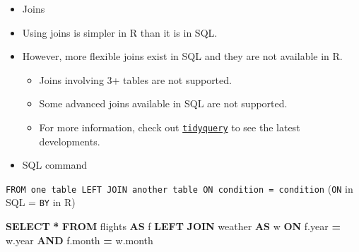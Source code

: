 \documentclass[
]{book}
\newenvironment{Shaded}{\begin{snugshade}}{\end{snugshade}}
\newcommand{\DataTypeTok}[1]{\textcolor[rgb]{0.13,0.29,0.53}{#1}}
\newcommand{\KeywordTok}[1]{\textcolor[rgb]{0.13,0.29,0.53}{\textbf{#1}}}
\newcommand{\NormalTok}[1]{#1}
\newcommand{\OperatorTok}[1]{\textcolor[rgb]{0.81,0.36,0.00}{\textbf{#1}}}
\providecommand{\tightlist}{%
  \setlength{\itemsep}{0pt}\setlength{\parskip}{0pt}}
\begin{document}
\begin{itemize}
\item
  Joins
\item
  Using joins is simpler in R than it is in SQL.
\item
  However, more flexible joins exist in SQL and they are not available in R.

  \begin{itemize}
  \tightlist
  \item
    Joins involving 3+ tables are not supported.
  \item
    Some advanced joins available in SQL are not supported.
  \item
    For more information, check out \href{https://github.com/ianmcook/tidyquery/issues}{\texttt{tidyquery}} to see the latest developments.
  \end{itemize}
\item
  SQL command
\end{itemize}

\texttt{FROM\ one\ table\ LEFT\ JOIN\ another\ table\ ON\ condition\ =\ condition} (\texttt{ON} in SQL = \texttt{BY} in R)

\begin{Shaded}
\begin{Highlighting}[]
\KeywordTok{SELECT} \OperatorTok{*}
\KeywordTok{FROM}\NormalTok{ flights }\KeywordTok{AS}\NormalTok{ f}
\KeywordTok{LEFT} \KeywordTok{JOIN}\NormalTok{ weather }\KeywordTok{AS}\NormalTok{ w }
\KeywordTok{ON}\NormalTok{ f.}\DataTypeTok{year} \OperatorTok{=}\NormalTok{ w.}\DataTypeTok{year} \KeywordTok{AND}\NormalTok{ f.}\DataTypeTok{month} \OperatorTok{=}\NormalTok{ w.}\DataTypeTok{month}
\end{Highlighting}
\end{Shaded}
\end{document}
